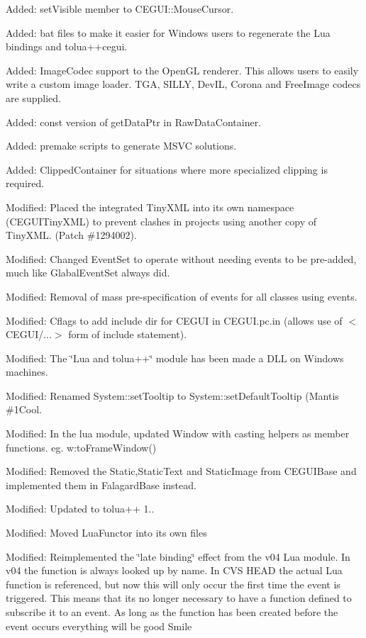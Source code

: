 \begin{DoxyItemize}
\item Added\+: set\+Visible member to C\+E\+G\+U\+I\+::\+Mouse\+Cursor.
\item Added\+: bat files to make it easier for Windows users to regenerate the Lua bindings and tolua++cegui.
\item Added\+: Image\+Codec support to the Open\+GL renderer. This allows users to easily write a custom image loader. T\+GA, S\+I\+L\+LY, Dev\+IL, Corona and Free\+Image codecs are supplied.
\item Added\+: const version of get\+Data\+Ptr in Raw\+Data\+Container.
\item Added\+: premake scripts to generate M\+S\+VC solutions.
\item Added\+: Clipped\+Container for situations where more specialized clipping is required.
\item Modified\+: Placed the integrated Tiny\+X\+ML into its own namespace (C\+E\+G\+U\+I\+Tiny\+X\+ML) to prevent clashes in projects using another copy of Tiny\+X\+ML. (Patch \#1294002).
\item Modified\+: Changed Event\+Set to operate without needing events to be pre-\/added, much like Glabal\+Event\+Set always did.
\item Modified\+: Removal of mass pre-\/specification of events for all classes using events.
\item Modified\+: Cflags to add include dir for C\+E\+G\+UI in C\+E\+G\+U\+I.\+pc.\+in (allows use of $<$C\+E\+G\+U\+I/...$>$ form of include statement).
\item Modified\+: The \char`\"{}\+Lua and tolua++\char`\"{} module has been made a D\+LL on Windows machines.
\item Modified\+: Renamed System\+::set\+Tooltip to System\+::set\+Default\+Tooltip (Mantis \#1Cool.
\item Modified\+: In the lua module, updated Window with casting helpers as member functions. eg. w\+:to\+Frame\+Window()
\item Modified\+: Removed the Static,Static\+Text and Static\+Image from C\+E\+G\+U\+I\+Base and implemented them in Falagard\+Base instead.
\item Modified\+: Updated to tolua++ 1..
\item Modified\+: Moved Lua\+Functor into its own files
\item Modified\+: Reimplemented the \char`\"{}late binding\char`\"{} effect from the v04 Lua module. In v04 the function is always looked up by name. In C\+VS H\+E\+AD the actual Lua function is referenced, but now this will only occur the first time the event is triggered. This means that it\textquotesingle{}s no longer necessary to have a function defined to subscribe it to an event. As long as the function has been created before the event occurs everything will be good Smile

\end{DoxyItemize}
